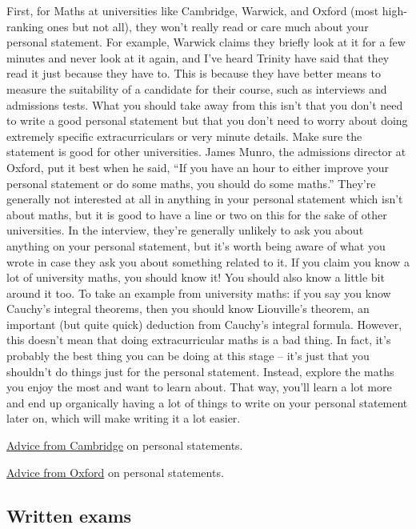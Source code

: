 \documentclass[11pt]{article}
\begin{document}
First, for Maths at universities like Cambridge, Warwick, and Oxford (most high-ranking ones but not all),
they won’t really read or care much about your personal statement. For example, Warwick claims they
briefly look at it for a few minutes and never look at it again, and I’ve heard Trinity have said that they
read it just because they have to. This is because they have better means to measure the suitability of a
candidate for their course, such as interviews and admissions tests.
What you should take away from this isn’t that you don’t need to write a good personal statement but that
you don’t need to worry about doing extremely specific extracurriculars or very minute details. Make sure
the statement is good for other universities. James Munro, the admissions director at Oxford, put it best
when he said, “If you have an hour to either improve your personal statement or do some maths, you should
do some maths.”
They’re generally not interested at all in anything in your personal statement which isn’t about maths, but
it is good to have a line or two on this for the sake of other universities. In the interview, they’re generally
unlikely to ask you about anything on your personal statement, but it’s worth being aware of what you wrote
in case they ask you about something related to it. If you claim you know a lot of university maths, you
should know it! You should also know a little bit around it too. To take an example from university maths:
if you say you know Cauchy’s integral theorems, then you should know Liouville’s theorem, an important
(but quite quick) deduction from Cauchy’s integral formula.
However, this doesn’t mean that doing extracurricular maths is a bad thing. In fact, it’s probably the best
thing you can be doing at this stage – it’s just that you shouldn’t do things just for the personal statement.
Instead, explore the maths you enjoy the most and want to learn about. That way, you’ll learn a lot more
and end up organically having a lot of things to write on your personal statement later on, which will make
writing it a lot easier.

\href{https://www.undergraduate.study.cam.ac.uk/apply/how/ucas-personal-statement}{Advice from Cambridge} on personal statements. 

\href{https://www.ox.ac.uk/admissions/undergraduate/applying-to-oxford/guide/ucas-application}{Advice from Oxford} on personal statements.

\subsection{Written exams}
\end{document}
